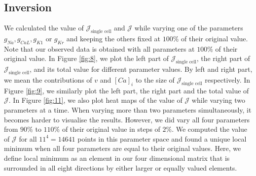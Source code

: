\documentclass{article}
\begin{document}
\subsection{Inversion} \label{Inversion}
We calculated the value of $\mathcal{J}_{\text{single cell}}$ and $\mathcal{J}$ while varying one of the parameters $g_{Na}, g_{CaL}, g_{K1}$ or $g_{Kr}$ and keeping the others fixed at $100\%$ of their original value. Note that our observed data is obtained with all parameters at $100\%$ of their original value. In Figure \ref{fig:8}, we plot the left part of $\mathcal{J}_{\text{single cell}}$, the right part of $\mathcal{J}_{\text{single cell}}$, and its total value for different parameter values. By left and right part, we mean the contributions of $v$ and $[Ca]_i$ to the size of $\mathcal{J}_{\text{single cell}}$ respectively. In Figure \ref{fig:9}, we similarly plot the left part, the right part and the total value of $\mathcal{J}$. In Figure \ref{fig:11}, we also plot heat maps of the value of $\mathcal{J}$ while varying two parameters at a time. When varying more than two parameters simultaneously, it becomes harder to visualise the results. However, we did vary all four parameters from $90\%$ to $110\%$ of their original value in steps of $2\%$. We computed the value of $\mathcal{J}$ for all $11^4=14641$ points in this parameter space and found a unique local minimum when all four parameters are equal to their original values. Here, we define local minimum as an element in our four dimensional matrix that is surrounded in all eight directions by either larger or equally valued elements.
\end{document}
